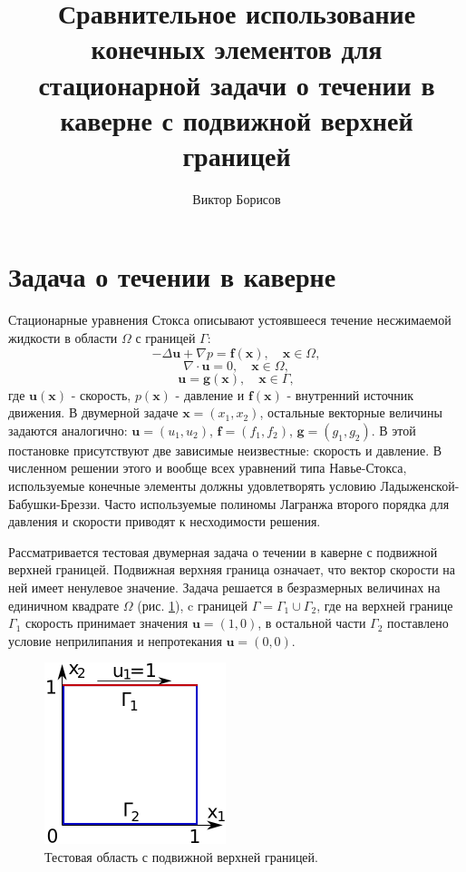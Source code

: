 \documentclass[12pt]{article}
\title{Сравнительное использование конечных элементов для стационарной задачи о течении в каверне с подвижной верхней границей}
\author{Виктор Борисов}
\begin{document}
\maketitle

\section{Задача о течении в каверне}
Стационарные уравнения Стокса описывают устоявшееся течение несжимаемой жидкости в области $\Omega$ с границей $\Gamma$:
\begin{equation}
-\Delta {\bm u} + \nabla p = {\bm f}({\bm x}), \quad {\bm x} \in \Omega,
\end{equation}
\begin{equation}
\nabla\cdot{\bm u} = 0, \quad {\bm x} \in \Omega,
\end{equation}
\begin{equation}
{\bm u} = {\bm g}({\bm x}), \quad {\bm x} \in \Gamma,
\end{equation}
где ${\bm u}({\bm x})$ - скорость, $p({\bm x})$ - давление и ${\bm f}({\bm x})$ - внутренний источник движения. В двумерной задаче ${\bm x}=(x_1, x_2)$, остальные векторные величины задаются аналогично: ${\bm u}=(u_1, u_2)$, ${\bm f}=(f_1, f_2)$, ${\bm g}=(g_1, g_2)$.
В этой постановке присутствуют две зависимые неизвестные: скорость и давление.
В численном решении этого и вообще всех уравнений типа Навье-Стокса, используемые конечные элементы должны удовлетворять условию Ладыженской-Бабушки-Бреззи. Часто используемые полиномы Лагранжа второго порядка для давления и скорости приводят к несходимости решения.

Рассматривается тестовая двумерная задача о течении в каверне с подвижной верхней границей. Подвижная верхняя граница означает, что вектор скорости на ней имеет ненулевое значение. Задача решается в безразмерных величинах на единичном квадрате $\Omega$ (рис. \ref{fg:cavity}), c границей $\Gamma=\Gamma_1 \cup \Gamma_2$, где на верхней границе $\Gamma_1$ скорость принимает значения ${\bm u}=(1, 0)$, в остальной части $\Gamma_2$ поставлено условие неприлипания и непротекания ${\bm u}=(0, 0)$.

\begin{figure}
	\begin{center}
		\includegraphics[width=200px]{pics/cavity400}
		\caption{Тестовая область с подвижной верхней границей.}
		\label{fg:cavity}
	\end{center}
\end{figure}
\end{document}
